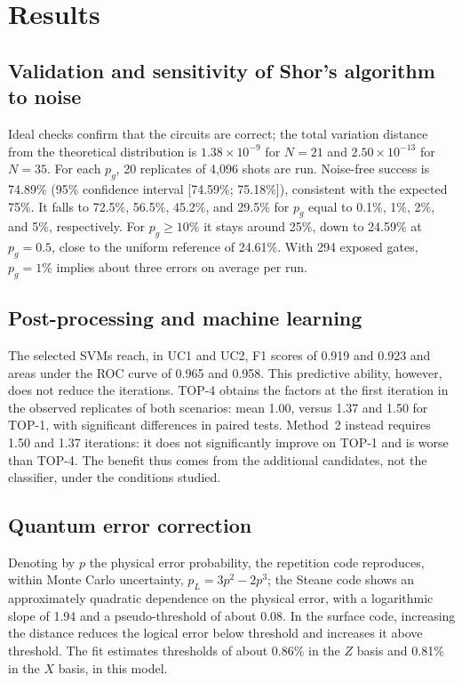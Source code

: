 \section{Results}

\subsection{Validation and sensitivity of Shor's algorithm to noise}

Ideal checks confirm that the circuits are correct; the total variation distance from the
theoretical distribution is \(1.38 \times 10^{-9}\) for \(N = 21\) and
\(2.50 \times 10^{-13}\) for \(N = 35\). For each \(p_g\), 20 replicates of 4,096 shots are
run. Noise-free success is 74.89\% (95\% confidence interval {[}74.59\%; 75.18\%{]}),
consistent with the expected 75\%. It falls to 72.5\%, 56.5\%, 45.2\%, and 29.5\% for
\(p_g\) equal to 0.1\%, 1\%, 2\%, and 5\%, respectively. For \(p_g \geq 10\%\) it stays
around 25\%, down to 24.59\% at \(p_g = 0.5\), close to the uniform reference of 24.61\%.
With 294 exposed gates, \(p_g = 1\%\) implies about three errors on average per run.

\subsection{Post-processing and machine learning}

The selected SVMs reach, in UC1 and UC2, F1 scores of 0.919 and 0.923 and areas under the
ROC curve of 0.965 and 0.958. This predictive ability, however, does not reduce the
iterations. TOP-4 obtains the factors at the first iteration in the observed replicates of
both scenarios: mean 1.00, versus 1.37 and 1.50 for TOP-1, with significant differences in
paired tests. Method~2 instead requires 1.50 and 1.37 iterations: it does not
significantly improve on TOP-1 and is worse than TOP-4. The benefit thus comes from the
additional candidates, not the classifier, under the conditions studied.

\subsection{Quantum error correction}\label{sec:results-qec-en}

Denoting by \(p\) the physical error probability, the repetition code reproduces, within
Monte Carlo uncertainty, \(p_L = 3p^2 - 2p^3\); the Steane code shows an approximately
quadratic dependence on the physical error, with a logarithmic slope of 1.94 and a
pseudo-threshold of about 0.08. In the surface code, increasing the distance reduces the
logical error below threshold and increases it above threshold. The fit estimates
thresholds of about 0.86\% in the \(Z\) basis and 0.81\% in the \(X\) basis, in this model.

